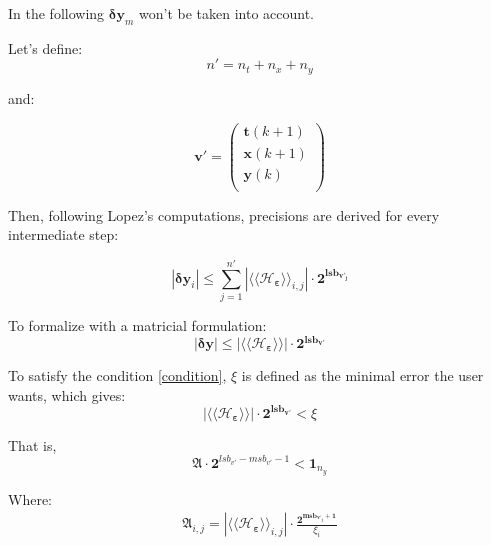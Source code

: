 		In the following $\boldsymbol{\delta y}_m$ won't be taken into account.

		Let's define:
			$$n'=n_t+n_x+n_y$$

		and:

			\begin{equation}
				\boldsymbol{v'}=
				\begin{pmatrix}
					\boldsymbol{t}(k+1) \\
					\boldsymbol{x}(k+1) \\
					\boldsymbol{y}(k)   \\
				\end{pmatrix}
			\end{equation}


		Then, following Lopez's computations, precisions are derived for every intermediate step:
		
		\begin{equation}
			|\boldsymbol{\delta y}_i| \leq \sum_{j=1}^{n'} | \langle\langle \mathcal{H}_{\boldsymbol{\varepsilon}} \rangle\rangle_{i,j}| \cdot \boldsymbol{2^{lsb_{v'_j}}}
		\end{equation}

		To formalize with a matricial formulation:
		\begin{equation}
			|\boldsymbol{\delta y}| \leq | \langle\langle \mathcal{H}_{\boldsymbol{\varepsilon}} \rangle\rangle| \cdot \boldsymbol{2^{lsb_{v'}}}
		\end{equation}


		To satisfy the condition \ref{condition}, $\xi$ is defined as the minimal error the user wants, which gives:
		\begin{equation}
			| \langle\langle \mathcal{H}_{\boldsymbol{\varepsilon}} \rangle\rangle| \cdot \boldsymbol{2^{lsb_{v'}}} < \xi
		\end{equation}

		That is, 
		\begin{equation} \label{constraint}
			\boldsymbol{\mathfrak{A}} \cdot \boldsymbol{2}^{lsb_{v'}-msb_{v'}-1} < \boldsymbol{1}_{n_y}
		\end{equation}

		Where:
		\begin{eqnarray}
			\boldsymbol{\mathfrak{A}}_{i,j}= | \langle\langle \mathcal{H}_{\boldsymbol{\varepsilon}} \rangle\rangle_{i,j} | \cdot \frac{\boldsymbol{2^{msb_{v'_j}+1}}}{\xi_i} %
		\end{eqnarray}

